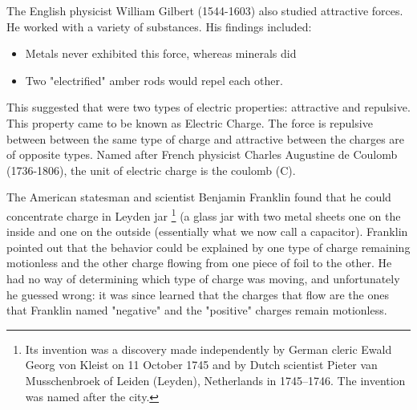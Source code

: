 \documentclass[14pt]{memoir}
\begin{document}
The English physicist William Gilbert (1544-1603) also studied attractive forces. He worked with a variety of substances. His findings included:
\begin{itemize}
\item Metals never exhibited this force, whereas minerals did
\item Two "electrified" amber rods would repel each other. 
\end{itemize}

This suggested that were two types of electric properties: attractive and repulsive. This property came to be known as Electric Charge. The force is repulsive between between the same type of charge and attractive between the charges are of opposite types. Named after French physicist Charles Augustine de Coulomb (1736-1806), the unit of electric charge is the coulomb (C).

The American statesman and scientist Benjamin Franklin found that he could concentrate charge in Leyden jar \footnote{Its invention was a discovery made independently by German cleric Ewald Georg von Kleist on 11 October 1745 and by Dutch scientist Pieter van Musschenbroek of Leiden (Leyden), Netherlands in 1745–1746. The invention was named after the city.} (a glass jar with two metal sheets one on the inside and one on the outside (essentially what we now call a capacitor). Franklin pointed out that the behavior could be explained by one type of charge remaining motionless and the other charge flowing from one piece of foil to the other. He had no way of determining which type of charge was moving, and unfortunately he guessed wrong: it was since learned that the charges that flow are the ones that Franklin named "negative" and the "positive" charges remain motionless.
\end{document}
